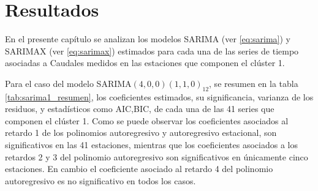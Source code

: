 \documentclass[12pt,oneside]{book}\usepackage[]{graphicx}\usepackage[]{color}
\theoremstyle{definition} %
\begin{document}

\chapter{Resultados}
\label{chap:resultados}

En el presente capítulo se analizan los modelos SARIMA (ver \ref{eq:sarima}) y SARIMAX (ver \ref{eq:sarimax}) estimados para cada una de las series de tiempo asociadas a Caudales medidos en las estaciones que componen el clúster 1. 



Para el caso del modelo SARIMA$(4,0,0)(1,1,0)_{12}$, se resumen en la tabla \ref{tab:sarima1_resumen}, los coeficientes estimados, su significancia, varianza de los residuos, y estadísticos como AIC,BIC, de cada una de las 41 series que componen el clúster 1. Como se puede observar los coeficientes asociados al retardo 1 de los polinomios autoregresivo y autoregresivo estacional, son significativos en las 41 estaciones, mientras que los coeficientes asociados a los retardos 2 y 3 del polinomio autoregresivo son significativos en únicamente cinco estaciones. En cambio el coeficiente asociado al retardo 4 del polinomio autoregresivo es no significativo en todos los casos.
\end{document}
